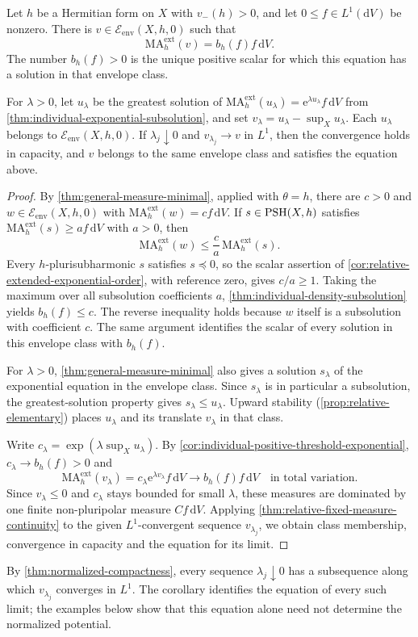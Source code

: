 \begin{corollary}\label{cor:positive-lower-mass-exact-threshold}
Let $h$ be a Hermitian form on $X$ with $v_-(h)>0$, and let $0\leq f\in L^1(\mathrm{d}V)$ be nonzero. There is $v\in\mathcal E_{\mathrm{env}}(X,h,0)$ such that
\[
 \mathrm{MA}^{\mathrm{ext}}_h(v)=b_h(f)f\,\mathrm{d}V.
\]
The number $b_h(f)>0$ is the unique positive scalar for which this equation has a solution in that envelope class.

For $\lambda>0$, let $u_\lambda$ be the greatest solution of $\mathrm{MA}^{\mathrm{ext}}_h(u_\lambda)=\mathrm{e}^{\lambda u_\lambda}f\,\mathrm{d}V$ from \cref{thm:individual-exponential-subsolution}, and set $v_\lambda=u_\lambda-\sup_Xu_\lambda$. Each $u_\lambda$ belongs to $\mathcal E_{\mathrm{env}}(X,h,0)$. If $\lambda_j\downarrow0$ and $v_{\lambda_j}\to v$ in $L^1$, then the convergence holds in capacity, and $v$ belongs to the same envelope class and satisfies the equation above.
\end{corollary}
\begin{proof}
By \cref{thm:general-measure-minimal}, applied with $\theta=h$, there are $c>0$ and $w\in\mathcal E_{\mathrm{env}}(X,h,0)$ with $\mathrm{MA}^{\mathrm{ext}}_h(w)=cf\,\mathrm{d}V$. If $s\in\mathrm{PSH}(X,h)$ satisfies $\mathrm{MA}^{\mathrm{ext}}_h(s)\geq af\,\mathrm{d}V$ with $a>0$, then
\[
 \mathrm{MA}^{\mathrm{ext}}_h(w)
       \leq\frac ca\,\mathrm{MA}^{\mathrm{ext}}_h(s).
\]
Every $h$-plurisubharmonic $s$ satisfies $s\preceq0$, so the scalar assertion of \cref{cor:relative-extended-exponential-order}, with reference zero, gives $c/a\geq1$. Taking the maximum over all subsolution coefficients $a$, \cref{thm:individual-density-subsolution} yields $b_h(f)\leq c$. The reverse inequality holds because $w$ itself is a subsolution with coefficient $c$. The same argument identifies the scalar of every solution in this envelope class with $b_h(f)$.

For $\lambda>0$, \cref{thm:general-measure-minimal} also gives a solution $s_\lambda$ of the exponential equation in the envelope class. Since $s_\lambda$ is in particular a subsolution, the greatest-solution property gives $s_\lambda\leq u_\lambda$. Upward stability (\cref{prop:relative-elementary}) places $u_\lambda$ and its translate $v_\lambda$ in that class.

Write $c_\lambda=\exp(\lambda\sup_Xu_\lambda)$. By \cref{cor:individual-positive-threshold-exponential}, $c_\lambda\to b_h(f)>0$ and
\[
 \mathrm{MA}^{\mathrm{ext}}_h(v_\lambda)
       =c_\lambda\mathrm{e}^{\lambda v_\lambda}f\,\mathrm{d}V
       \longrightarrow b_h(f)f\,\mathrm{d}V
       \quad\text{in total variation}.
\]
Since $v_\lambda\leq0$ and $c_\lambda$ stays bounded for small $\lambda$, these measures are dominated by one finite non-pluripolar measure $C f\,\mathrm{d}V$. Applying \cref{thm:relative-fixed-measure-continuity} to the given $L^1$-convergent sequence $v_{\lambda_j}$, we obtain class membership, convergence in capacity and the equation for its limit.
\end{proof}

By \cref{thm:normalized-compactness}, every sequence $\lambda_j\downarrow0$ has a subsequence along which $v_{\lambda_j}$ converges in $L^1$. The corollary identifies the equation of every such limit; the examples below show that this equation alone need not determine the normalized potential.
